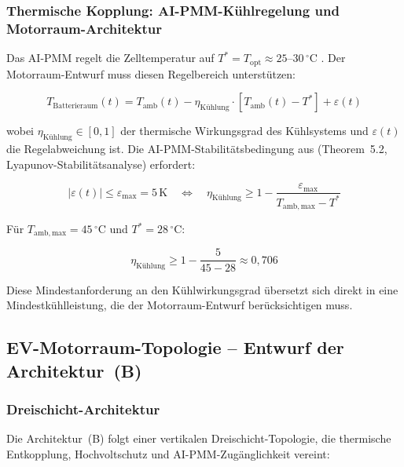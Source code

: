 ﻿\documentclass[12pt,a4paper]{article}
\begin{document}
\subsubsection{Thermische Kopplung: AI-PMM-Kühlregelung und Motorraum-Archi\-tektur}

Das AI-PMM regelt die Zelltemperatur auf $T^* = T_\mathrm{opt} \approx 25\text{--}30\,^\circ\mathrm{C}$
\cite{Epp2026liion}. Der Motorraum-Entwurf muss diesen Regelbereich unterstützen:

\begin{equation}
	T_\mathrm{Batterieraum}(t) = T_\mathrm{amb}(t) - \eta_\mathrm{Kühlung}
	\cdot \left[T_\mathrm{amb}(t) - T^*\right] + \varepsilon(t)
	\label{eq:batt_temp_eq}
\end{equation}

wobei $\eta_\mathrm{Kühlung} \in [0,1]$ der thermische Wirkungsgrad des
Kühlsystems und $\varepsilon(t)$ die Regelabweichung ist. Die AI-PMM-Stabilitätsbedingung
aus \cite{Epp2026liion} (Theorem~5.2, Lyapunov-Stabilitätsanalyse) erfordert:

\begin{equation}
	|\varepsilon(t)| \leq \varepsilon_\mathrm{max} = 5\,\mathrm{K}
	\quad \Leftrightarrow \quad
	\eta_\mathrm{Kühlung} \geq 1 - \frac{\varepsilon_\mathrm{max}}{T_\mathrm{amb,max} - T^*}
	\label{eq:kuehlwirkungsgrad}
\end{equation}

Für $T_\mathrm{amb,max} = 45\,^\circ\mathrm{C}$ und $T^* = 28\,^\circ\mathrm{C}$:

\begin{equation}
	\eta_\mathrm{Kühlung} \geq 1 - \frac{5}{45 - 28} \approx 0{,}706
	\label{eq:kuehlwirkungsgrad_num}
\end{equation}

Diese Mindestanforderung an den Kühlwirkungsgrad übersetzt sich direkt in eine
Mindestkühlleistung, die der Motorraum-Entwurf berücksichtigen muss.

\subsection{EV-Motorraum-Topologie -- Entwurf der Architektur~(B)}

\subsubsection{Dreischicht-Architektur}

Die Architektur~(B) folgt einer vertikalen Dreischicht-Topologie, die thermische
Entkopplung, Hochvoltschutz und AI-PMM-Zugänglichkeit vereint:
\end{document}
